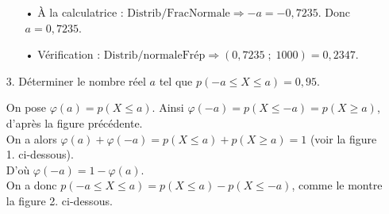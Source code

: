 \begin{itemize}
\vspace*{.3cm}

\begin{itemize}
\item[•] À la calculatrice : $\mathrm{Distrib/FracNormale} \Longrightarrow -a = -0,7235$. Donc $a = 0,7235$. 
\item[•] Vérification : $\mathrm{Distrib/normaleFrép} \Longrightarrow \left(0,7235 \; ; \; 1000\right) = 0,2347$. 
\end{itemize}

\vspace*{.3cm}

\samepage

\item[3.] Déterminer le nombre réel $a$ tel que $p\left(-a \leqslant X \leqslant a\right) = 0,95$.

On pose $\varphi\left(a\right) = p\left(X \leqslant a\right)$. Ainsi $\varphi\left(-a\right) = p\left(X \leqslant -a\right) = p\left(X \geqslant a\right)$, d'après la figure précédente. \\

On a alors $\varphi\left(a\right) + \varphi\left(-a\right) = p\left(X \leqslant a\right) + p\left(X \geqslant a\right) = 1$ (voir la figure 1. ci-dessous). \\ D'où $\varphi\left(-a\right) = 1 - \varphi\left(a\right)$. \\

On a donc $p\left(-a \leqslant X \leqslant a\right) = p\left(X \leqslant a\right) - p\left(X \leqslant -a\right)$, comme le montre la figure 2. ci-dessous. \\
\end{itemize}

\vspace*{-.2cm}


